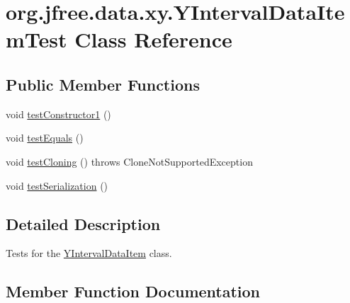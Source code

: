 \hypertarget{classorg_1_1jfree_1_1data_1_1xy_1_1_y_interval_data_item_test}{}\section{org.\+jfree.\+data.\+xy.\+Y\+Interval\+Data\+Item\+Test Class Reference}
\label{classorg_1_1jfree_1_1data_1_1xy_1_1_y_interval_data_item_test}
\subsection*{Public Member Functions}
\begin{DoxyCompactItemize}
\item 
void \mbox{\hyperlink{classorg_1_1jfree_1_1data_1_1xy_1_1_y_interval_data_item_test_a91818bd0ae86b3ae029f0d5a15f9e662}{test\+Constructor1}} ()
\item 
void \mbox{\hyperlink{classorg_1_1jfree_1_1data_1_1xy_1_1_y_interval_data_item_test_a6121e84de45b74d04ab308ed487f6954}{test\+Equals}} ()
\item 
void \mbox{\hyperlink{classorg_1_1jfree_1_1data_1_1xy_1_1_y_interval_data_item_test_a05bedad4031119b8ba26a398c454efd9}{test\+Cloning}} ()  throws Clone\+Not\+Supported\+Exception 
\item 
void \mbox{\hyperlink{classorg_1_1jfree_1_1data_1_1xy_1_1_y_interval_data_item_test_a85c3642e2c983960d40f859056a73f17}{test\+Serialization}} ()
\end{DoxyCompactItemize}


\subsection{Detailed Description}
Tests for the \mbox{\hyperlink{classorg_1_1jfree_1_1data_1_1xy_1_1_y_interval_data_item}{Y\+Interval\+Data\+Item}} class. 

\subsection{Member Function Documentation}
\mbox{\label{classorg_1_1jfree_1_1data_1_1xy_1_1_y_interval_data_item_test_a05bedad4031119b8ba26a398c454efd9}} 
